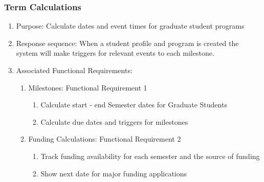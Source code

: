 \documentclass{journal}
\begin{document}
				\subsubsection{Term Calculations}
				\begin{enumerate}
				\item Purpose: Calculate dates and event times for graduate student programs 
				\item Response sequence: When a student profile and program is created the system will make triggers for relevant events to each milestone.
				\item Associated Functional Requirements:
				\begin{enumerate}
				\item Milestones: Functional Requirement 1
				\begin{enumerate}
				\item Calculate start - end  Semester dates for Graduate Students
				\item Calculate due dates and triggers for milestones
				\end{enumerate}
				\item Funding Calculations: Functional Requirement 2
				\begin{enumerate}
				\item Track funding availability for each semester and the source of funding
				\item Show next date for major funding applications
				\end{enumerate}
				\end{enumerate}
				\end{enumerate}
\end{document}
